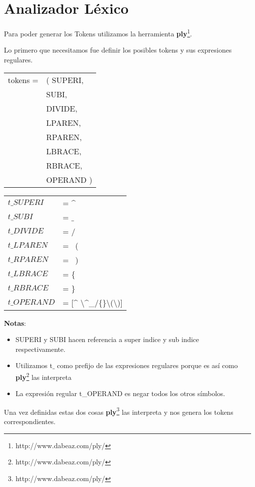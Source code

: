 \section{Analizador L\'exico}

Para poder generar los Tokens utilizamos la herramienta \textbf{ply}\footnote{http://www.dabeaz.com/ply/}. 

Lo primero que necesitamos fue definir los posibles tokens y sus expresiones regulares.


\begin{center}
\begin{tabular}{ l  l }
  tokens =  & ( SUPERI, \\
    &    SUBI,  \\
    &    DIVIDE, \\
    &    LPAREN,  \\
    &    RPAREN, \\
    &    LBRACE, \\
    &   RBRACE, \\
    &    OPERAND ) \\
\end{tabular}
\end{center}

\begin{center}
\begin{tabular}{ l  l }
  $t\_SUPERI$   &=  \^{} \\
  $t\_SUBI$   &=    $\_$  \\
  $t\_DIVIDE$   &=    $/$ \\
  $t\_LPAREN$    &=    \ (  \\
  $t\_RPAREN$    &=    \ ) \\
  $t\_LBRACE$  &=    \{ \\
  $t\_RBRACE$  &=   \} \\
  $t\_OPERAND$  &=   [\^{} $\setminus$\^{}\_/\{\}$\setminus$($\setminus$)] \\
\end{tabular}
\end{center}


\textbf{Notas}: 
\begin{itemize}
  \item SUPERI y SUBI hacen referencia a super indice y sub indice respectivamente.
  \item Utilizamos t$\_$ como prefijo de las expresiones regulares porque es as\'i como \textbf{ply}\footnote{http://www.dabeaz.com/ply/} las interpreta
  \item La expresi\'on regular t\_OPERAND es negar todos los otros s\'imbolos.
\end{itemize}



Una vez definidas estas dos cosas \textbf{ply}\footnote{http://www.dabeaz.com/ply/} las interpreta y nos genera los tokens correspondientes.

